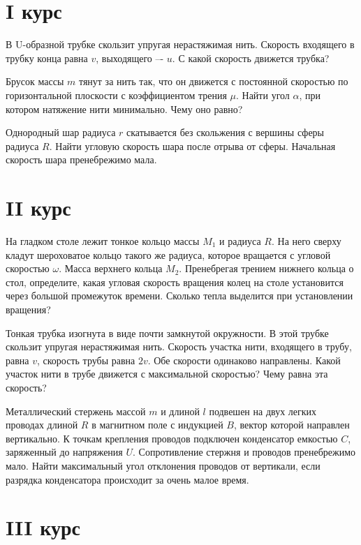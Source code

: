 \section{I курс}

\AddProb В U-образной трубке скользит упругая нерастяжимая нить. Скорость входящего в трубку конца равна $v$, выходящего –- $u$. 
С какой скорость движется трубка?

\AddProb Брусок массы $m$ тянут за нить так, что он движется с постоянной скоростью по горизонтальной плоскости с коэффициентом трения $\mu$. 
Найти угол $\alpha$, при котором натяжение нити минимально. Чему оно равно?

\AddProb Однородный шар радиуса $r$ скатывается без скольжения с вершины сферы радиуса $R$. Найти угловую скорость шара после отрыва от сферы. 
Начальная скорость шара пренебрежимо мала.


\section{II курс}

\AddProb На гладком столе лежит тонкое кольцо массы $M_1$ и радиуса $R$. На него сверху кладут шероховатое кольцо такого же радиуса, 
которое вращается с угловой скоростью $\omega$. Масса верхнего кольца $M_2$. Пренебрегая трением нижнего кольца о стол, определите, 
какая угловая скорость вращения колец на столе установится через большой промежуток времени. Сколько тепла выделится при установлении вращения?

\AddProb Тонкая трубка изогнута в виде почти замкнутой окружности. В этой трубке скользит упругая нерастяжимая нить. 
Скорость участка нити, входящего в трубу, равна $v$, скорость трубы равна $2v$. Обе скорости одинаково направлены. 
Какой участок нити в трубе движется с максимальной скоростью? Чему равна эта скорость?

\AddProb Металлический стержень массой $m$ и длиной $l$ подвешен на двух легких проводах длиной $R$ в магнитном поле с индукцией $B$, 
вектор которой направлен вертикально. К точкам крепления проводов подключен конденсатор емкостью $C$, заряженный до напряжения $U$. 
Сопротивление стержня и проводов пренебрежимо мало. Найти максимальный угол отклонения проводов от вертикали, 
если разрядка конденсатора происходит за очень малое время.


\section{III курс}

